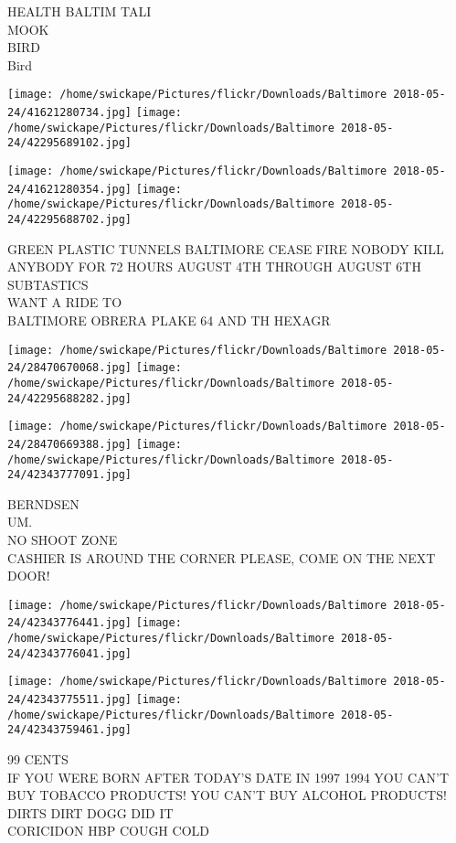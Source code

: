 \documentclass[10pt,letterpaper]{article}
\begin{document}
HEALTH BALTIM TALI\\
MOOK\\
BIRD\\
Bird
\pagebreak

\texttt{[image: /home/swickape/Pictures/flickr/Downloads/Baltimore 2018-05-24/41621280734.jpg]}
\texttt{[image: /home/swickape/Pictures/flickr/Downloads/Baltimore 2018-05-24/42295689102.jpg]}

\texttt{[image: /home/swickape/Pictures/flickr/Downloads/Baltimore 2018-05-24/41621280354.jpg]}
\texttt{[image: /home/swickape/Pictures/flickr/Downloads/Baltimore 2018-05-24/42295688702.jpg]}

GREEN PLASTIC TUNNELS BALTIMORE CEASE FIRE NOBODY KILL ANYBODY FOR 72 HOURS AUGUST 4TH THROUGH AUGUST 6TH\\
SUBTASTICS\\
WANT A RIDE TO\\
BALTIMORE OBRERA PLAKE 64 AND TH HEXAGR
\pagebreak

\texttt{[image: /home/swickape/Pictures/flickr/Downloads/Baltimore 2018-05-24/28470670068.jpg]}
\texttt{[image: /home/swickape/Pictures/flickr/Downloads/Baltimore 2018-05-24/42295688282.jpg]}

\texttt{[image: /home/swickape/Pictures/flickr/Downloads/Baltimore 2018-05-24/28470669388.jpg]}
\texttt{[image: /home/swickape/Pictures/flickr/Downloads/Baltimore 2018-05-24/42343777091.jpg]}

BERNDSEN\\
UM.\\
NO SHOOT ZONE\\
CASHIER IS AROUND THE CORNER PLEASE, COME ON THE NEXT DOOR!
\pagebreak

\texttt{[image: /home/swickape/Pictures/flickr/Downloads/Baltimore 2018-05-24/42343776441.jpg]}
\texttt{[image: /home/swickape/Pictures/flickr/Downloads/Baltimore 2018-05-24/42343776041.jpg]}

\texttt{[image: /home/swickape/Pictures/flickr/Downloads/Baltimore 2018-05-24/42343775511.jpg]}
\texttt{[image: /home/swickape/Pictures/flickr/Downloads/Baltimore 2018-05-24/42343759461.jpg]}

99 CENTS\\
IF YOU WERE BORN AFTER TODAY'S DATE IN 1997 1994 YOU CAN'T BUY TOBACCO PRODUCTS!  YOU CAN'T BUY ALCOHOL PRODUCTS!\\
DIRTS DIRT DOGG DID IT\\
CORICIDON HBP COUGH COLD
\pagebreak
\end{document}
